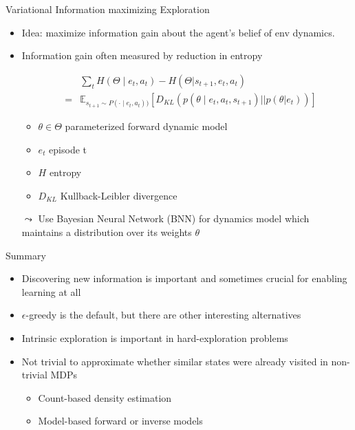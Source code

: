 \documentclass[aspectratio=169]{../latex_main/tntbeamer}  %
\begin{document}
\begin{frame}[c]{Variational Information maximizing Exploration }
	
	\begin{itemize}
		\item Idea: maximize information gain about the agent's belief of env dynamics.
		\item Information gain often measured by reduction in entropy
		
		\begin{eqnarray}
		&&\sum_t H(\Theta \mid e_t, a_t) - H(\Theta | s_{t+1}, e_t, a_t)\nonumber\\
		&=& \mathbb{E}_{s_{t+1}\sim P(\cdot\mid e_t, a_t))} \left[ D_{KL} (p(\theta \mid e_t, a_t, s_{t+1}) || p(\theta|e_t))  \right]\nonumber
		\end{eqnarray}
		
		\begin{itemize}
			\item $\theta \in \Theta$ parameterized forward dynamic model
			\item $e_t$ episode t
			\item $H$ entropy
			\item $D_{KL}$ Kullback-Leibler divergence
		\end{itemize}
	
		\item[$\leadsto$] Use Bayesian Neural Network (BNN) for dynamics model which maintains a distribution over its weights $\theta$
		
	\end{itemize}
	
\end{frame}

\begin{frame}[c]{Summary}
	
	\begin{itemize}
		\item Discovering new information is important and sometimes crucial for enabling learning at all
		\item $\epsilon$-greedy is the default, but there are other interesting alternatives
		\item Intrinsic exploration is important in hard-exploration problems
		\item Not trivial to approximate whether similar states were already visited in non-trivial MDPs
		\begin{itemize}
		    \item Count-based density estimation
		    \item Model-based forward or inverse models
		\end{itemize}
	\end{itemize}
	
\end{frame}
\end{document}
